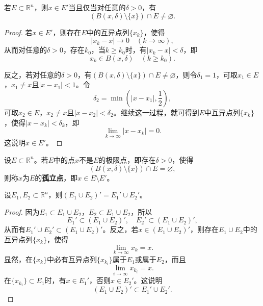\documentclass[../../main.tex]{subfiles}
\begin{document}
\begin{theorem}[一个点是极限点的充要条件]\label{theorem:一个点是极限点的充要条件}
若\(E\subset\mathbb{R}^n\)，则\(x\in E'\)当且仅当对任意的\(\delta>0\)，有
\[(B(x,\delta)\setminus\{x\})\cap E\neq\varnothing.\]
\end{theorem}
\begin{proof}
  若\(x\in E'\)，则存在\(E\)中的互异点列\(\{x_k\}\)，使得
\[|x_k - x|\to 0\quad(k\to\infty),\]
从而对任意的\(\delta>0\)，存在\(k_0\)，当\(k\geqslant k_0\)时，有\(|x_k - x|<\delta\)，即
\[x_k\in B(x,\delta)\quad(k\geqslant k_0).\]

反之，若对任意的\(\delta>0\)，有\((B(x,\delta)\setminus\{x\})\cap E\neq\varnothing\)，则令\(\delta_1 = 1\)，可取\(x_1\in E\)，\(x_1\neq x\)且\(|x - x_1|<1\)。令
\[\delta_2=\min\left(|x - x_1|,\frac{1}{2}\right),\]
可取\(x_2\in E\)，\(x_2\neq x\)且\(|x - x_2|<\delta_2\)。继续这一过程，就可得到\(E\)中互异点列\(\{x_k\}\)，使得\(|x - x_k|<\delta_k\)，即
\[\lim_{k\to\infty}|x - x_k| = 0.\]
这说明\(x\in E'\)。
\end{proof}

\begin{definition}[孤立点]\label{definition:孤立点}
  设\(E\subset\mathbb{R}^n\)。若\(E\)中的点\(x\)不是\(E\)的极限点，即存在\(\delta>0\)，使得
\[(B(x,\delta)\setminus\{x\})\cap E=\varnothing,\]
则称\(x\)为\(E\)的\textbf{孤立点}，即\(x\in E\setminus E'\)。
\end{definition}

\begin{theorem}[导集的性质]\label{theorem:导集的性质}
设\(E_1,E_2\subset\mathbb{R}^n\)，则\((E_1\cup E_2)' = E_1'\cup E_2'\)。
\end{theorem}
\begin{proof}
  因为\(E_1\subset E_1\cup E_2\)，\(E_2\subset E_1\cup E_2\)，所以
\[E_1'\subset (E_1\cup E_2)',\quad E_2'\subset (E_1\cup E_2)',\]
从而有\(E_1'\cup E_2'\subset (E_1\cup E_2)'\)。反之，若\(x\in (E_1\cup E_2)'\)，则存在\(E_1\cup E_2\)中的互异点列\(\{x_k\}\)，使得
\[\lim_{k\rightarrow\infty}x_k = x.\]
显然，在\(\{x_k\}\)中必有互异点列\(\{x_{k_i}\}\)属于\(E_1\)或属于\(E_2\)，而且
\[\lim_{i\rightarrow\infty}x_{k_i} = x.\]
在\(\{x_{k_i}\}\subset E_1\)时，有\(x\in E_1'\)，否则\(x\in E_2'\)。这说明
\[(E_1\cup E_2)'\subset E_1'\cup E_2'.\]
\end{proof}
\end{document}
